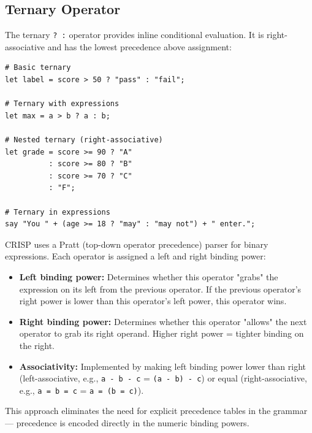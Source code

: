\subsection{Ternary Operator}

The ternary \texttt{? :} operator provides inline conditional evaluation. It is right-associative and has the lowest precedence above assignment:

\begin{tcolorbox}[colback=codebg, colframe=darkpurple, colbacktitle=darkpurple, title=\textbf{\textcolor{codegold}{Ternary Operator}}, fonttitle=\bfseries, sharp corners]
\begin{lstlisting}
# Basic ternary
let label = score > 50 ? "pass" : "fail";

# Ternary with expressions
let max = a > b ? a : b;

# Nested ternary (right-associative)
let grade = score >= 90 ? "A"
          : score >= 80 ? "B"
          : score >= 70 ? "C"
          : "F";

# Ternary in expressions
say "You " + (age >= 18 ? "may" : "may not") + " enter.";
\end{lstlisting}
\end{tcolorbox}

\begin{tcolorbox}[colback=lightlavender, colframe=softvioletdark, title=\textbf{\textcolor{darkpurple}{Design Note: Pratt Parsing}}, fonttitle=\bfseries, sharp corners]
CRISP uses a Pratt (top-down operator precedence) parser for binary expressions. Each operator is assigned a left and right binding power:

\begin{itemize}
    \item \textbf{Left binding power:} Determines whether this operator "grabs" the expression on its left from the previous operator. If the previous operator's right power is lower than this operator's left power, this operator wins.
    \item \textbf{Right binding power:} Determines whether this operator "allows" the next operator to grab its right operand. Higher right power = tighter binding on the right.
    \item \textbf{Associativity:} Implemented by making left binding power lower than right (left-associative, e.g., \texttt{a - b - c} = \texttt{(a - b) - c}) or equal (right-associative, e.g., \texttt{a = b = c} = \texttt{a = (b = c)}).
\end{itemize}

This approach eliminates the need for explicit precedence tables in the grammar — precedence is encoded directly in the numeric binding powers.
\end{tcolorbox}
